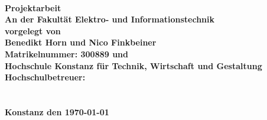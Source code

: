 \begin{titlepage}
\vspace*{-3cm}
    \begin{figure}[ht]
        \hspace{7cm}
    \end{figure}
        
	\begin{center}
		\vspace*{1cm}
		\LARGE\bf\myTopic\\
		\vspace*{1cm}
		\normalsize\rm
		\vspace*{1cm}
		\textbf{Projektarbeit}\\
		\vspace*{0.5cm}
		An der Fakultät Elektro- und Informationstechnik \\
		\vspace*{0.5cm}
		vorgelegt von  \\
	    \vspace*{0.25cm}
		\textbf{Benedikt Horn und Nico Finkbeiner}  \\
		\vspace*{0.25cm}
		Matrikelnummer: 300889 und \myMatrikelnummer \\
		\vspace*{1cm}
		Hochschule Konstanz für Technik, Wirtschaft und Gestaltung \\
		\vspace*{1cm}
		Hochschulbetreuer: \\
		\textbf{\mySupervisorTwo}\\
		\textbf{\mySupervisor}\\
		\vspace*{1cm}
		\textbf{Konstanz den \today}
	\end{center}
\end{titlepage}
\newpage
\setcounter{page}{2}

